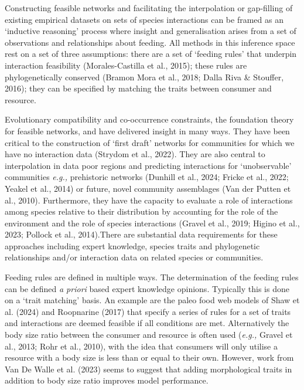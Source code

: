 \documentclass[
]{article}
\begin{document}
Constructing feasible networks and facilitating the interpolation or
gap-filling of existing empirical datasets on sets of species
interactions can be framed as an `inductive reasoning' process where
insight and generalisation arises from a set of observations and
relationships about feeding. All methods in this inference space rest on
a set of three assumptions: there are a set of `feeding rules' that
underpin interaction feasibility (Morales-Castilla et al., 2015); these
rules are phylogenetically conserved (Bramon Mora et al., 2018; Dalla
Riva \& Stouffer, 2016); they can be specified by matching the traits
between consumer and resource.

Evolutionary compatibility and co-occurrence constraints, the foundation
theory for feasible networks, and have delivered insight in many ways.
They have been critical to the construction of `first draft' networks
for communities for which we have no interaction data (Strydom et al.,
2022). They are also central to interpolation in data poor regions and
predicting interactions for `unobservable' communities \emph{e.g.,}
prehistoric networks (Dunhill et al., 2024; Fricke et al., 2022; Yeakel
et al., 2014) or future, novel community assemblages (Van der Putten et
al., 2010). Furthermore, they have the capacity to evaluate a role of
interactions among species relative to their distribution by accounting
for the role of the environment and the role of species interactions
(Gravel et al., 2019; Higino et al., 2023; Pollock et al., 2014).There
are substantial data requirements for these approaches including expert
knowledge, species traits and phylogenetic relationships and/or
interaction data on related species or communities.

Feeding rules are defined in multiple ways. The determination of the
feeding rules can be defined \emph{a priori} based expert knowledge
opinions. Typically this is done on a `trait matching' basis. An example
are the paleo food web models of Shaw et al. (2024) and Roopnarine
(2017) that specify a series of rules for a set of traits and
interactions are deemed feasible if all conditions are met.
Alternatively the body size ratio between the consumer and resource is
often used (\emph{e.g.,} Gravel et al., 2013; Rohr et al., 2010), with
the idea that consumers will only utilise a resource with a body size is
less than or equal to their own. However, work from Van De Walle et al.
(2023) seems to suggest that adding morphological traits in addition to
body size ratio improves model performance.
\end{document}

